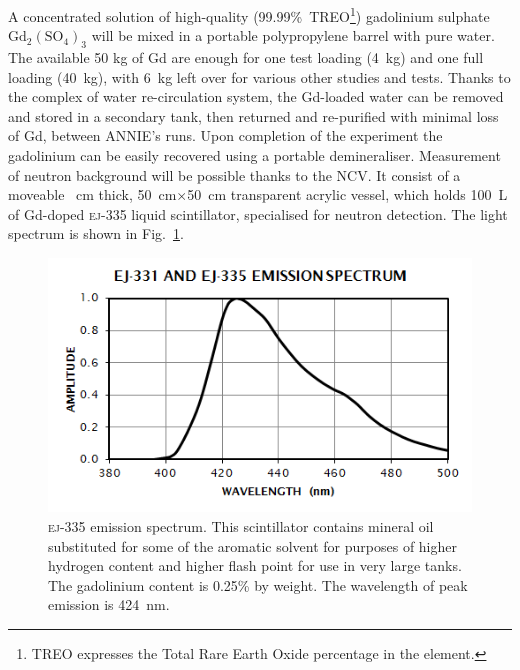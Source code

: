 
 A concentrated solution of high-quality (99.99\%~TREO\footnote{TREO expresses the %
   Total Rare Earth Oxide percentage in the element.}) gadolinium sulphate %
 $\mathrm{Gd}_2(\mathrm{SO}_4)_3$ will be mixed in a portable polypropylene barrel with pure water.
 The available 50 kg of Gd are enough for one test loading (4~kg) and %
 one full loading (40~kg), with 6~kg left over for various other studies and tests.
 Thanks to the complex of water re-circulation system, the Gd-loaded water can be removed %
 and stored in a secondary tank, then returned and re-purified with minimal loss of Gd, %
 between ANNIE's runs.
 Upon completion of the experiment the gadolinium can be easily recovered using a %
 portable demineraliser.
 Measurement of neutron background will be possible thanks to the NCV.
 It consist of a moveable ~cm thick, 50~cm$\times$50~cm transparent acrylic vessel, %
 which holds 100~L of Gd-doped \textsc{ej-335} liquid scintillator, %
 specialised for neutron detection.
 The light spectrum is shown in Fig.~\ref{fig:ej335}.

 \begin{figure}[]
   \centering
   \includegraphics[scale=0.60]{pics/ej335}
   \caption{\textsc{ej-335} emission spectrum. This scintillator contains mineral oil %
 substituted for some of the aromatic solvent for purposes of higher hydrogen content %
 and higher flash point for use in very large tanks. The gadolinium content is 0.25\% by weight.
 The wavelength of peak emission is 424~nm.}
   \label{fig:ej335}
 \end{figure}

